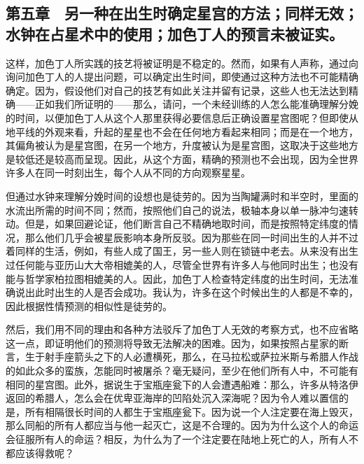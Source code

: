 
\subsection{第五章　另一种在出生时确定星宫的方法；同样无效；水钟在占星术中的使用；加色丁人的预言未被证实。}

这样，加色丁人所实践的技艺将被证明是不稳定的。然而，如果有人声称，通过向询问加色丁人的人提出问题，可以确定出生时间，即使通过这种方法也不可能精确确定。因为，假设他们对自己的技艺有如此关注并留有记录，这些人也无法达到精确——正如我们所证明的——那么，请问，一个未经训练的人怎么能准确理解分娩的时间，以便加色丁人从这个人那里获得必要信息后正确设置星宫图呢？但即使从地平线的外观来看，升起的星星也不会在任何地方看起来相同；而是在一个地方，其偏角被认为是星宫图，在另一个地方，升度被认为是星宫图，这取决于这些地方是较低还是较高而呈现。因此，从这个方面，精确的预测也不会出现，因为全世界许多人在同一时刻出生，每个人从不同的方向观察星星。\par

但通过水钟来理解分娩时间的设想也是徒劳的。因为当陶罐满时和半空时，里面的水流出所需的时间不同；然而，按照他们自己的说法，极轴本身以单一脉冲匀速转动。但是，如果回避论证，他们断言自己不精确地取时间，而是按照特定纬度的情况，那么他们几乎会被星辰影响本身所反驳。因为那些在同一时间出生的人并不过着同样的生活，例如，有些人成了国王，另一些人则在锁链中老去。从来没有出生过任何能与亚历山大大帝相媲美的人，尽管全世界有许多人与他同时出生；也没有能与哲学家柏拉图相媲美的人。因此，加色丁人检查特定纬度的出生时间，无法准确说出此时出生的人是否会成功。我认为，许多在这个时候出生的人都是不幸的，因此根据性情预测的相似性是徒劳的。\par

然后，我们用不同的理由和各种方法驳斥了加色丁人无效的考察方式，也不应省略这一点，即证明他们的预测将导致无法解决的困难。因为，如果按照占星家的断言，生于射手座箭头之下的人必遭横死，那么，在马拉松或萨拉米斯与希腊人作战的如此众多的蛮族，怎能同时被屠杀？毫无疑问，至少在他们所有人中，不可能有相同的星宫图。此外，据说生于宝瓶座瓮下的人会遭遇船难：那么，许多从特洛伊返回的希腊人，怎么会在优卑亚海岸的凹陷处沉入深海呢？因为令人难以置信的是，所有相隔很长时间的人都生于宝瓶座瓮下。因为说一个人注定要在海上毁灭，那么同船的所有人都应当与他一起灭亡，这是不合理的。因为为什么这个人的命运会征服所有人的命运？相反，为什么为了一个注定要在陆地上死亡的人，所有人不都应该得救呢？\par


